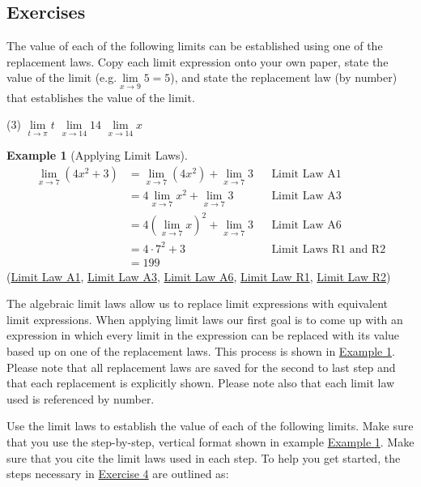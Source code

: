 \documentclass[12pt,]{book}
\theoremstyle{plain}
\theoremstyle{definition}
\newtheorem{example}[theorem]{Example}
\numberwithin{equation}{section}
\begin{document}
\subsection[Exercises]{Exercises}\label{exercises-6}
\hypertarget{exercisegroup-16}{\null}The value of each of the following limits can be established using one of the replacement laws. Copy each limit expression onto your own paper, state the value of the limit (e.g.\@ \(\lim\limits_{x\to9}5=5\)), and state the replacement law (by number) that establishes the value of the limit.%
\par
\begin{exercisegroup}(3)
\exercise[1.]\hypertarget{exercise-66}{\null}\(\lim\limits_{t\to\pi}t\)%
\exercise[2.]\hypertarget{exercise-67}{\null}\(\lim\limits_{x\to14}14\)%
\exercise[3.]\hypertarget{exercise-68}{\null}\(\lim\limits_{x\to14}x\)%
\end{exercisegroup}
\par\smallskip\noindent
\begin{example}[Applying Limit Laws]\label{example-apply-limit-laws}
\begin{align*}
\lim_{x\to7}\left(4x^2+3\right)&=\lim_{x\to7}\left(4x^2\right)+\lim_{x\to7}3&&\text{Limit Law A1}\\
&=4\lim_{x\to7}x^2+\lim_{x\to7}3&&\text{Limit Law A3}\\
&=4\left(\lim_{x\to7}x\right)^2+\lim_{x\to7}3&&\text{Limit Law A6}\\
&=4\cdot7^2+3&&\text{Limit Laws R1 and R2}\\
&=199
\end{align*}(\hyperref[lla1]{Limit Law A1}, \hyperref[lla3]{Limit Law A3}, \hyperref[lla6]{Limit Law A6}, \hyperref[llr1]{Limit Law R1}, \hyperref[llr2]{Limit Law R2})%
\end{example}
\hypertarget{exercisegroup-17}{\null}The algebraic limit laws allow us to replace limit expressions with equivalent limit expressions. When applying limit laws our first goal is to come up with an expression in which every limit in the expression can be replaced with its value based up on one of the replacement laws. This process is shown in \hyperref[example-apply-limit-laws]{Example \ref{example-apply-limit-laws}}. Please note that all replacement laws are saved for the second to last step and that each replacement is explicitly shown. Please note also that each limit law used is referenced by number.%
\par
Use the limit laws to establish the value of each of the following limits. Make sure that you use the step-by-step, vertical format shown in example \hyperref[example-apply-limit-laws]{Example \ref{example-apply-limit-laws}}. Make sure that you cite the limit laws used in each step. To help you get started, the steps necessary in \hyperlink{exercise-first-apply-limit-laws}{Exercise 4} are outlined as:%
\end{document}
